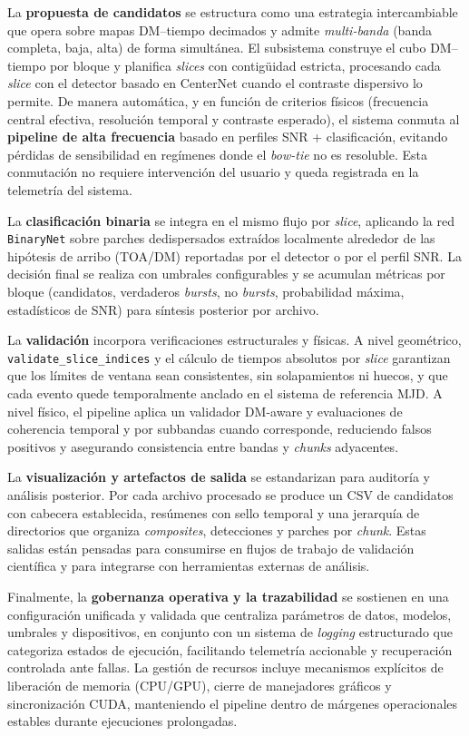 La \textbf{propuesta de candidatos} se estructura como una estrategia intercambiable que opera sobre mapas DM--tiempo decimados y admite \emph{multi-banda} (banda completa, baja, alta) de forma simultánea. El subsistema construye el cubo DM--tiempo por bloque y planifica \emph{slices} con contigüidad estricta, procesando cada \emph{slice} con el detector basado en CenterNet cuando el contraste dispersivo lo permite. De manera automática, y en función de criterios físicos (frecuencia central efectiva, resolución temporal y contraste esperado), el sistema conmuta al \textbf{pipeline de alta frecuencia} basado en perfiles SNR + clasificación, evitando pérdidas de sensibilidad en regímenes donde el \emph{bow-tie} no es resoluble. Esta conmutación no requiere intervención del usuario y queda registrada en la telemetría del sistema.

La \textbf{clasificación binaria} se integra en el mismo flujo por \emph{slice}, aplicando la red \texttt{BinaryNet} sobre parches dedispersados extraídos localmente alrededor de las hipótesis de arribo (TOA/DM) reportadas por el detector o por el perfil SNR. La decisión final se realiza con umbrales configurables y se acumulan métricas por bloque (candidatos, verdaderos \emph{bursts}, no \emph{bursts}, probabilidad máxima, estadísticos de SNR) para síntesis posterior por archivo.

La \textbf{validación} incorpora verificaciones estructurales y físicas. A nivel geométrico, \texttt{validate\_slice\_indices} y el cálculo de tiempos absolutos por \emph{slice} garantizan que los límites de ventana sean consistentes, sin solapamientos ni huecos, y que cada evento quede temporalmente anclado en el sistema de referencia MJD. A nivel físico, el pipeline aplica un validador DM-aware y evaluaciones de coherencia temporal y por subbandas cuando corresponde, reduciendo falsos positivos y asegurando consistencia entre bandas y \emph{chunks} adyacentes.

La \textbf{visualización y artefactos de salida} se estandarizan para auditoría y análisis posterior. Por cada archivo procesado se produce un CSV de candidatos con cabecera establecida, resúmenes con sello temporal y una jerarquía de directorios que organiza \emph{composites}, detecciones y parches por \emph{chunk}. Estas salidas están pensadas para consumirse en flujos de trabajo de validación científica y para integrarse con herramientas externas de análisis.

Finalmente, la \textbf{gobernanza operativa y la trazabilidad} se sostienen en una configuración unificada y validada  que centraliza parámetros de datos, modelos, umbrales y dispositivos, en conjunto con un sistema de \emph{logging} estructurado que categoriza estados de ejecución, facilitando telemetría accionable y recuperación controlada ante fallas. La gestión de recursos incluye mecanismos explícitos de liberación de memoria (CPU/GPU), cierre de manejadores gráficos y sincronización CUDA, manteniendo el pipeline dentro de márgenes operacionales estables durante ejecuciones prolongadas.

